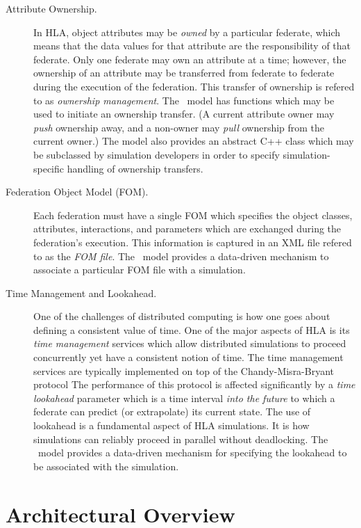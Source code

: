 \begin{description}
\item[Attribute Ownership.]
In HLA, object attributes may be {\em owned} by a particular federate, 
which means that the data values for that attribute are the responsibility
of that federate.
Only one federate may own an attribute at a time; however, the ownership of an
attribute may be transferred from federate to federate during the execution of
the federation.
This transfer of ownership is refered to as {\em ownership management}.
The \TrickHLA\ model has functions which may be used to initiate an ownership
transfer.
(A current attribute owner may {\em push} ownership away,
and a non-owner may {\em pull} ownership from the current owner.)
The model also provides an abstract C++ class which may be subclassed by simulation
developers in order to specify simulation-specific handling of ownership transfers.

\item[Federation Object Model (FOM).]
Each federation must have a single FOM which specifies the object classes, 
attributes, interactions, and parameters which are exchanged during the
federation's execution.
This information is captured in an XML file refered to as the {\em FOM file}.
The \TrickHLA\ model provides a data-driven mechanism to associate a particular
FOM file with a simulation.

\item[Time Management and Lookahead.]
One of the challenges of distributed computing is how one goes about defining
a consistent value of time. 
One of the major aspects of HLA is its {\em time management} services which
allow distributed simulations to proceed concurrently yet have a consistent notion
of time. 
The time management services are typically implemented on top of the
Chandy-Misra-Bryant protocol\cite{art:chandy-misra}
The performance of this protocol is affected significantly by a 
{\em time lookahead} parameter\cite{art:fujimoto-acm}
which is a time interval {\em into the future} to which a federate can predict
(or extrapolate) its current state.
The use of lookahead is a fundamental aspect of HLA simulations.
It is how simulations can reliably proceed in parallel without deadlocking.
The \TrickHLA\ model provides a data-driven mechanism for specifying the lookahead
to be associated with the simulation.

\end{description}

\section{Architectural Overview}

